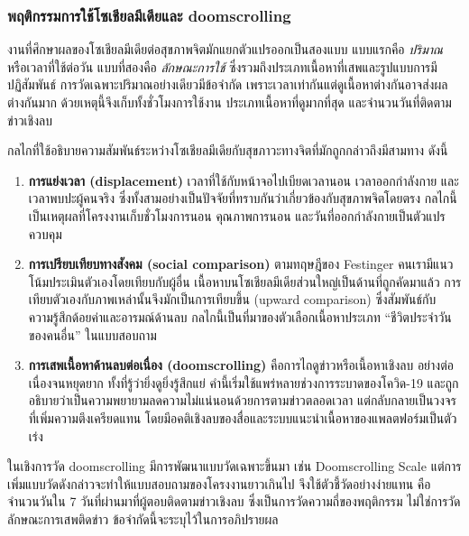 \subsubsection*{พฤติกรรมการใช้โซเชียลมีเดียและ doomscrolling}

งานที่ศึกษาผลของโซเชียลมีเดียต่อสุขภาพจิตมักแยกตัวแปรออกเป็นสองแบบ
แบบแรกคือ \textit{ปริมาณ} หรือเวลาที่ใช้ต่อวัน แบบที่สองคือ \textit{ลักษณะการใช้}
ซึ่งรวมถึงประเภทเนื้อหาที่เสพและรูปแบบการมีปฏิสัมพันธ์
การวัดเฉพาะปริมาณอย่างเดียวมีข้อจำกัด เพราะเวลาเท่ากันแต่ดูเนื้อหาต่างกันอาจส่งผลต่างกันมาก
ด้วยเหตุนี้จึงเก็บทั้งชั่วโมงการใช้งาน ประเภทเนื้อหาที่ดูมากที่สุด และจำนวนวันที่ติดตามข่าวเชิงลบ

กลไกที่ใช้อธิบายความสัมพันธ์ระหว่างโซเชียลมีเดียกับสุขภาวะทางจิตที่มักถูกกล่าวถึงมีสามทาง ดังนี้

\begin{enumerate}[label=\arabic*),leftmargin=1.9cm,itemsep=0.15em,topsep=0.2em]
    \item \textbf{การแย่งเวลา (displacement)} เวลาที่ใช้กับหน้าจอไปเบียดเวลานอน เวลาออกกำลังกาย
          และเวลาพบปะผู้คนจริง ซึ่งทั้งสามอย่างเป็นปัจจัยที่ทราบกันว่าเกี่ยวข้องกับสุขภาพจิตโดยตรง
          กลไกนี้เป็นเหตุผลที่โครงงานเก็บชั่วโมงการนอน คุณภาพการนอน และวันที่ออกกำลังกายเป็นตัวแปรควบคุม
    \item \textbf{การเปรียบเทียบทางสังคม (social comparison)} ตามทฤษฎีของ Festinger
          \cite{festinger1954social} คนเรามีแนวโน้มประเมินตัวเองโดยเทียบกับผู้อื่น
          เนื้อหาบนโซเชียลมีเดียส่วนใหญ่เป็นด้านที่ถูกคัดมาแล้ว
          การเทียบตัวเองกับภาพเหล่านั้นจึงมักเป็นการเทียบขึ้น (upward comparison)
          ซึ่งสัมพันธ์กับความรู้สึกด้อยค่าและอารมณ์ด้านลบ
          กลไกนี้เป็นที่มาของตัวเลือกเนื้อหาประเภท ``ชีวิตประจำวันของคนอื่น'' ในแบบสอบถาม
    \item \textbf{การเสพเนื้อหาด้านลบต่อเนื่อง (doomscrolling)} คือการไถดูข่าวหรือเนื้อหาเชิงลบ
          อย่างต่อเนื่องจนหยุดยาก ทั้งที่รู้ว่ายิ่งดูยิ่งรู้สึกแย่
          คำนี้เริ่มใช้แพร่หลายช่วงการระบาดของโควิด-19
          และถูกอธิบายว่าเป็นความพยายามลดความไม่แน่นอนด้วยการตามข่าวตลอดเวลา
          แต่กลับกลายเป็นวงจรที่เพิ่มความตึงเครียดแทน
          โดยมีอคติเชิงลบของสื่อและระบบแนะนำเนื้อหาของแพลตฟอร์มเป็นตัวเร่ง
\end{enumerate}

\noindent
ในเชิงการวัด doomscrolling มีการพัฒนาแบบวัดเฉพาะขึ้นมา เช่น Doomscrolling Scale
แต่การเพิ่มแบบวัดดังกล่าวจะทำให้แบบสอบถามของโครงงานยาวเกินไป
จึงใช้ตัวชี้วัดอย่างง่ายแทน คือจำนวนวันใน 7 วันที่ผ่านมาที่ผู้ตอบติดตามข่าวเชิงลบ
ซึ่งเป็นการวัดความถี่ของพฤติกรรม ไม่ใช่การวัดลักษณะการเสพติดข่าว
ข้อจำกัดนี้จะระบุไว้ในการอภิปรายผล

